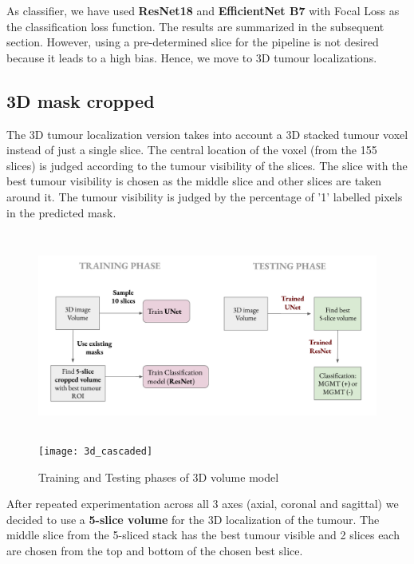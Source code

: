 As classifier, we have used \textbf{ResNet18} and \textbf{EfficientNet B7} with Focal Loss as the classification loss function. The results are summarized in the subsequent section. However, using a pre-determined slice for the pipeline is not desired because it leads to a high bias. Hence, we move to 3D tumour localizations.

\subsection{3D mask cropped}\label{3D_cropped}
\vspace*{4mm}
The 3D tumour localization version takes into account a 3D stacked tumour voxel instead of just a single slice. The central location of the voxel (from the 155 slices) is judged according to the tumour visibility of the slices. The slice with the best tumour visibility is chosen as the middle slice and other slices are taken around it. The tumour visibility is judged by the percentage of '1' labelled pixels in the predicted mask. 

\begin{figure}[H]
  \begin{center}
    \leavevmode
    \ifpdf
      \includegraphics[height=2.7in]{Methodology/Chapter3Figs/cascaded_training_testing.png}
    \else
      \texttt{[image: 3d\_cascaded]}
    \fi
    \caption{Training and Testing phases of 3D volume model}
    \label{3d_cascaded}
  \end{center}
\end{figure}

After repeated experimentation across all 3 axes (axial, coronal and sagittal) we decided to use a \textbf{5-slice volume} for the 3D localization of the tumour. The middle slice from the 5-sliced stack has the best tumour visible and 2 slices each are chosen from the top and bottom of the chosen best slice.

